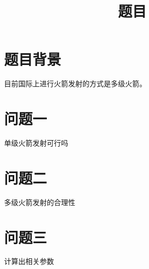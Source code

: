 \documentclass[11pt,UTF8,notitlepage]{article}
\title{题目}
\begin{document}
    \maketitle
    \tableofcontents
    \section{题目背景}
    目前国际上进行火箭发射的方式是多级火箭。
    \section{问题一}
    单级火箭发射可行吗
    \section{问题二}
    多级火箭发射的合理性
    \section{问题三}
    计算出相关参数
    
\end{document}
